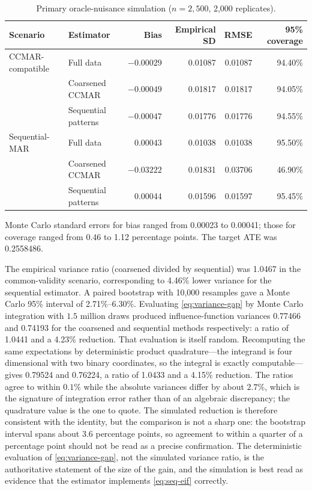 \documentclass[11pt]{article}
\theoremstyle{definition}
\newcommand{\1}{\mathbf{1}}
\begin{document}
\begin{table}[ht]
\centering
\begin{threeparttable}
\caption{Primary oracle-nuisance simulation ($n=2{,}500$, 2,000 replicates).}
\label{tab:main-results}
\small
\begin{tabular}{@{}llrrrr@{}}
\toprule
Scenario & Estimator & Bias & Empirical SD & RMSE & 95\% coverage \\
\midrule
CCMAR-compatible & Full data & $-0.00029$ & 0.01087 & 0.01087 & 94.40\% \\
 & Coarsened CCMAR & $-0.00049$ & 0.01817 & 0.01817 & 94.05\% \\
 & Sequential patterns & $-0.00047$ & 0.01776 & 0.01776 & 94.55\% \\
\addlinespace
Sequential-MAR & Full data & 0.00043 & 0.01038 & 0.01038 & 95.50\% \\
 & Coarsened CCMAR & $-0.03222$ & 0.01831 & 0.03706 & 46.90\% \\
 & Sequential patterns & 0.00044 & 0.01596 & 0.01597 & 95.45\% \\
\bottomrule
\end{tabular}
\begin{tablenotes}[flushleft]\footnotesize
\item Monte Carlo standard errors for bias ranged from 0.00023 to 0.00041; those for coverage ranged from 0.46 to 1.12 percentage points. The target ATE was 0.2558486.
\end{tablenotes}
\end{threeparttable}
\end{table}

The empirical variance ratio (coarsened divided by sequential) was 1.0467 in the common-validity scenario, corresponding to 4.46\% lower variance for the sequential estimator. A paired bootstrap with 10,000 resamples gave a Monte Carlo 95\% interval of 2.71\%--6.30\%. Evaluating \cref{eq:variance-gap} by Monte Carlo integration with $1.5$ million
draws produced influence-function variances 0.77466 and 0.74193 for the
coarsened and sequential methods respectively: a ratio of 1.0441 and a 4.23\%
reduction. That evaluation is itself random. Recomputing the same expectations by
deterministic product quadrature---the integrand is four dimensional with two
binary coordinates, so the integral is exactly computable---gives 0.79524 and
0.76224, a ratio of 1.0433 and a 4.15\% reduction. The ratios agree to within
$0.1\%$ while the absolute variances differ by about $2.7\%$, which is the
signature of integration error rather than of an algebraic discrepancy; the
quadrature value is the one to quote. The simulated reduction
is therefore consistent with the identity, but the comparison is not a sharp
one: the bootstrap interval spans about 3.6 percentage points, so agreement to
within a quarter of a percentage point should not be read as a precise
confirmation. The deterministic evaluation of \cref{eq:variance-gap}, not the
simulated variance ratio, is the authoritative statement of the size of the
gain, and the simulation is best read as evidence that the estimator implements
\cref{eq:seq-eif} correctly.
\end{document}
